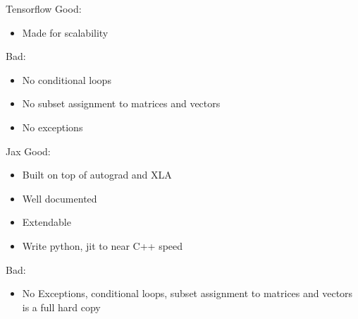 \documentclass[dvipsnames]{beamer}
\begin{document}
\begin{frame}{Tensorflow}
Good:
\begin{itemize}
    \item Made for scalability
\end{itemize}
Bad:
\begin{itemize}
    \item No conditional loops
    \item No subset assignment to matrices and vectors
    \item No exceptions
\end{itemize}
\end{frame}

\begin{frame}{Jax}
Good:
\begin{itemize}
    \item Built on top of autograd and XLA
    \item Well documented
    \item Extendable
    \item Write python, jit to near C++ speed
\end{itemize}
Bad:
\begin{itemize}
    \item No Exceptions, conditional loops, subset assignment to matrices and vectors is a full hard copy
\end{itemize}
\end{frame}
\end{document}
